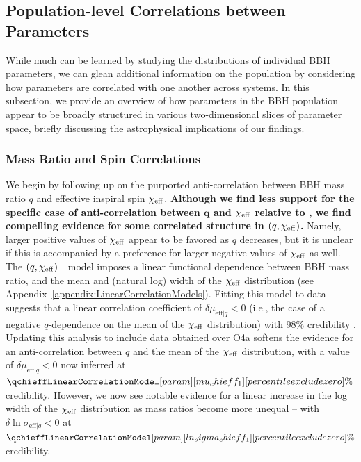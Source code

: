 
\subsection{Population-level Correlations between Parameters}
\label{sec:Population-level correlations between parameters}

While much can be learned by studying the distributions of individual \ac{BBH} parameters, we can glean additional information on the population by considering how parameters are correlated with one another across systems.
In this subsection, we provide an overview of how parameters in the \ac{BBH} population appear to be broadly structured in various two-dimensional slices of parameter space, briefly discussing the astrophysical implications of our findings.

\subsubsection{Mass Ratio and Spin Correlations}
\label{subsubsec:mass_ratio_spin_correlations}
We begin by following up on the purported anti-correlation between \ac{BBH} mass ratio $q$ and effective inspiral spin $\chi_{\rm eff}$.
\textbf{Although we find less support for the specific case of anti-correlation between $\bm{q}$ and $\bm{\chieff}$ relative to \gwtcthree, we find compelling evidence for some correlated structure in $\bm{(q,\chieff)}$.}
Namely, larger positive values of $\chi_{\rm eff}$ appear to be favored as $q$ decreases, but it is unclear if this is accompanied by a preference for larger negative values of $\chi_{\rm eff}$ as well.
The $(q,\chi_{\rm eff})$~\linearcorrelation~model imposes a linear functional dependence between \ac{BBH} mass ratio, and the mean and (natural log) width of the $\chi_{\rm eff}$ distribution (see Appendix~\ref{appendix:LinearCorrelationModels}).
Fitting this model to \gwtcthree data suggests that a linear correlation coefficient of $\delta \mu_{\mathrm{eff}|q} < 0$ (i.e., the case of a negative $q$-dependence on the mean of the $\chi_{\rm eff}$ distribution) with 98\% credibility \citep{KAGRA:2021duu}.
Updating this analysis to include data obtained over \ac{O4a} softens the evidence for an anti-correlation between $q$ and the mean of the $\chi_{\rm eff}$ distribution, with a value of $\delta \mu_{\mathrm{eff}|q} < 0$ now inferred at $\qchieffLinearCorrelationModel[param][mu_chieff_1][percentile exclude zero]\%$ credibility.
However, we now see notable evidence for a linear increase in the log width of the $\chi_{\rm eff}$ distribution as mass ratios become more unequal -- with $\delta \ln \sigma_{\mathrm{eff}|q} < 0$ at $\qchieffLinearCorrelationModel[param][ln_sigma_chieff_1][percentile exclude zero]\%$ credibility.

